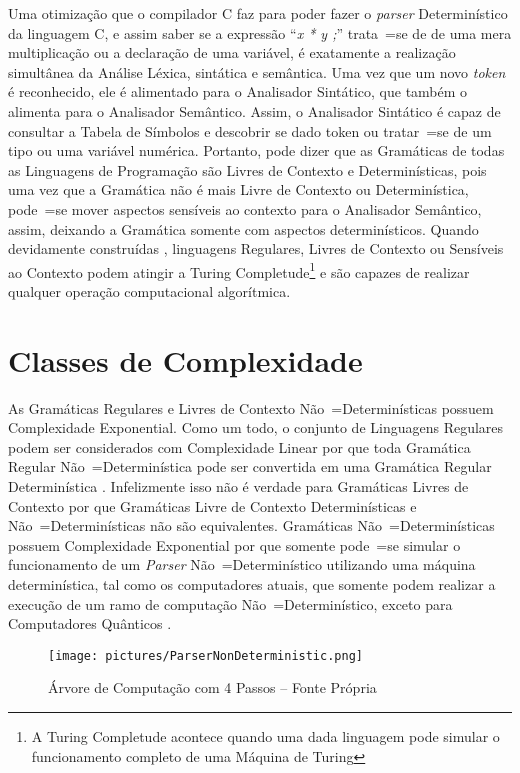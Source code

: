 {    Uma otimização que o compilador C faz para poder fazer
    o \textit{parser} Determinístico da linguagem C,
    e assim saber se a expressão ``\textit{x * y ;}'' trata~=se de
    de uma mera multiplicação ou a declaração de uma variável,
    é exatamente a realização simultânea da Análise Léxica,
    sintática e
    semântica.
    Uma vez que um novo \textit{token} é reconhecido,
    ele é alimentado para o Analisador Sintático,
    que também o alimenta para o Analisador Semântico.
    Assim,
    o Analisador Sintático é capaz de consultar a Tabela de Símbolos\cite{ahoCompilerDragonBook} e
    descobrir se dado token ou tratar~=se de um tipo ou uma variável numérica.
    Portanto,
    pode dizer que as Gramáticas de todas as Linguagens de Programação são Livres de Contexto e
    Determinísticas,
    pois uma vez que a Gramática não é mais Livre de Contexto ou Determinística,
    pode~=se mover aspectos sensíveis ao contexto para o Analisador Semântico,
    assim,
    deixando a Gramática somente com aspectos determinísticos.
    Quando devidamente construídas \cite{turingCompleteRegularLanguages},
    linguagens Regulares,
    Livres de Contexto ou Sensíveis ao Contexto podem atingir a Turing Completude\footnote{A Turing
    Completude acontece quando uma dada linguagem pode simular o funcionamento completo de uma
    Máquina de Turing} \cite{areThereDomainSpecificLanguages,contextSensitiveParsing} e
    são capazes de realizar qualquer operação computacional algorítmica.


\section{Classes de Complexidade}

    As Gramáticas Regulares e
    Livres de Contexto Não~=Determinísticas possuem Complexidade Exponential.
    Como um todo,
    o conjunto de Linguagens Regulares podem ser considerados com Complexidade
    Linear por que toda Gramática Regular Não~=Determinística pode ser
    convertida em uma Gramática Regular Determinística \cite{sipserBook}.
    Infelizmente isso não é verdade para Gramáticas Livres de Contexto
    por que Gramáticas Livre de Contexto Determinísticas e
    Não~=Determinísticas não são equivalentes.
    Gramáticas Não~=Determinísticas possuem Complexidade Exponential por que
    somente pode~=se simular o funcionamento de um \textit{Parser}
    Não~=Determinístico utilizando uma máquina determinística,
    tal como os computadores atuais,
    que somente podem realizar a execução de um ramo de computação Não~=Determinístico,
    exceto para Computadores Quânticos \cite{nonlinearQuantumComputers}.
    \begin{figure}[H]
    \centering
    \texttt{[image: pictures/ParserNonDeterministic.png]}
    \caption{Árvore de Computação com 4 Passos -- Fonte Própria}
    \label{fig:pictures/ParserNonDeterministic.png}
    \end{figure}

}

